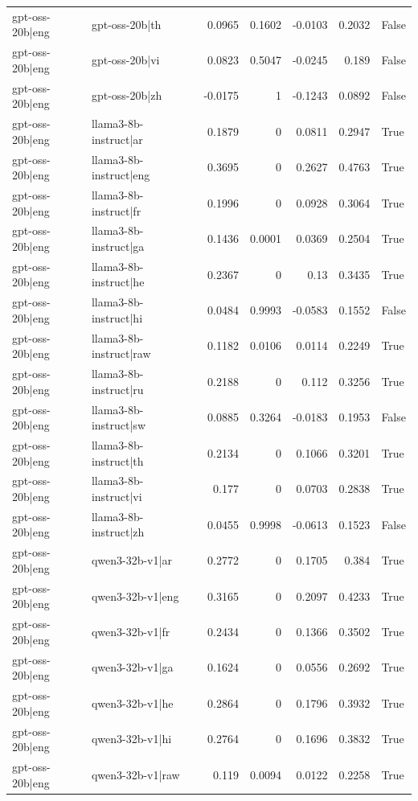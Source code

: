 \begin{table}
\begin{tabular}{l l r r r r l}
gpt-oss-20b|eng & gpt-oss-20b|th & 0.0965 & 0.1602 & -0.0103 & 0.2032 & False \\
gpt-oss-20b|eng & gpt-oss-20b|vi & 0.0823 & 0.5047 & -0.0245 & 0.189 & False \\
gpt-oss-20b|eng & gpt-oss-20b|zh & -0.0175 & 1 & -0.1243 & 0.0892 & False \\
gpt-oss-20b|eng & llama3-8b-instruct|ar & 0.1879 & 0 & 0.0811 & 0.2947 & True \\
gpt-oss-20b|eng & llama3-8b-instruct|eng & 0.3695 & 0 & 0.2627 & 0.4763 & True \\
gpt-oss-20b|eng & llama3-8b-instruct|fr & 0.1996 & 0 & 0.0928 & 0.3064 & True \\
gpt-oss-20b|eng & llama3-8b-instruct|ga & 0.1436 & 0.0001 & 0.0369 & 0.2504 & True \\
gpt-oss-20b|eng & llama3-8b-instruct|he & 0.2367 & 0 & 0.13 & 0.3435 & True \\
gpt-oss-20b|eng & llama3-8b-instruct|hi & 0.0484 & 0.9993 & -0.0583 & 0.1552 & False \\
gpt-oss-20b|eng & llama3-8b-instruct|raw & 0.1182 & 0.0106 & 0.0114 & 0.2249 & True \\
gpt-oss-20b|eng & llama3-8b-instruct|ru & 0.2188 & 0 & 0.112 & 0.3256 & True \\
gpt-oss-20b|eng & llama3-8b-instruct|sw & 0.0885 & 0.3264 & -0.0183 & 0.1953 & False \\
gpt-oss-20b|eng & llama3-8b-instruct|th & 0.2134 & 0 & 0.1066 & 0.3201 & True \\
gpt-oss-20b|eng & llama3-8b-instruct|vi & 0.177 & 0 & 0.0703 & 0.2838 & True \\
gpt-oss-20b|eng & llama3-8b-instruct|zh & 0.0455 & 0.9998 & -0.0613 & 0.1523 & False \\
gpt-oss-20b|eng & qwen3-32b-v1|ar & 0.2772 & 0 & 0.1705 & 0.384 & True \\
gpt-oss-20b|eng & qwen3-32b-v1|eng & 0.3165 & 0 & 0.2097 & 0.4233 & True \\
gpt-oss-20b|eng & qwen3-32b-v1|fr & 0.2434 & 0 & 0.1366 & 0.3502 & True \\
gpt-oss-20b|eng & qwen3-32b-v1|ga & 0.1624 & 0 & 0.0556 & 0.2692 & True \\
gpt-oss-20b|eng & qwen3-32b-v1|he & 0.2864 & 0 & 0.1796 & 0.3932 & True \\
gpt-oss-20b|eng & qwen3-32b-v1|hi & 0.2764 & 0 & 0.1696 & 0.3832 & True \\
gpt-oss-20b|eng & qwen3-32b-v1|raw & 0.119 & 0.0094 & 0.0122 & 0.2258 & True \\

\end{tabular}
\end{table}
